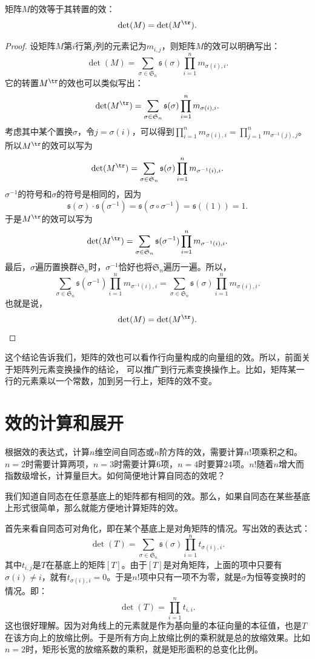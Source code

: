 \documentclass[12pt,UTF8,fontset=none]{ctexbook}
\begin{document}
\begin{pp}\label{pp:10_35}
    矩阵$M$的效等于其转置的效：
    $$ \det(M) = \det(M^{\tr}).$$
\end{pp}
\begin{proof} %
    设矩阵$M$第$i$行第$j$列的元素记为$m_{i,j}$，则矩阵$M$的效可以明确写出：
    $$ \det (M) = \sum_{\sigma\in\mathfrak{S}_n} \mathfrak{s}(\sigma) \prod_{i=1}^n m_{\sigma(i),i}. $$
    它的转置$M^{\tr}$的效也可以类似写出：
    $$ \det (M^{\tr}) = \sum_{\sigma\in\mathfrak{S}_n} \mathfrak{s}(\sigma) \prod_{i=1}^n m_{\sigma(i), i}. $$
    考虑其中某个置换$\sigma$，令$j = \sigma(i)$，可以得到$\prod_{i=1}^n m_{\sigma(i), i} = \prod_{j=1}^n m_{\sigma^{-1}(j), j}$。
    所以$M^{\tr}$的效可以写为
    $$ \det (M^{\tr}) = \sum_{\sigma\in\mathfrak{S}_n} \mathfrak{s}(\sigma) \prod_{i=1}^n m_{\sigma^{-1}(i), i}. $$
    $\sigma^{-1}$的符号和$\sigma$的符号是相同的，因为
    $$ \mathfrak{s}(\sigma) \cdot \mathfrak{s}(\sigma^{-1}) = \mathfrak{s}(\sigma \circ \sigma^{-1}) = \mathfrak{s}((1)) = 1. $$
    于是$M^{\tr}$的效可以写为
    $$ \det (M^{\tr}) = \sum_{\sigma\in\mathfrak{S}_n} \mathfrak{s}(\sigma^{-1}) \prod_{i=1}^n m_{\sigma^{-1}(i), i}. $$
    最后，$\sigma$遍历置换群$\mathfrak{S}_n$时，$\sigma^{-1}$恰好也将$\mathfrak{S}_n$遍历一遍。所以，
    $$ \sum_{\sigma\in\mathfrak{S}_n} \mathfrak{s}(\sigma^{-1}) \prod_{i=1}^n m_{\sigma^{-1}(i), i} = \sum_{\sigma\in\mathfrak{S}_n} \mathfrak{s}(\sigma) \prod_{i=1}^n m_{\sigma(i), i}. $$
    也就是说，
    $$ \det(M) = \det(M^{\tr}).$$
\end{proof}

这个结论告诉我们，矩阵的效也可以看作行向量构成的向量组的效。所以，前面关于矩阵列元素变换操作的结论，
可以推广到行元素变换操作上。比如，矩阵某一行的元素乘以一个常数，加到另一行上，矩阵的效不变。

\section{效的计算和展开}
根据效的表达式，计算$n$维空间自同态或$n$阶方阵的效，需要计算$n!$项乘积之和。$n=2$时需要计算两项，$n=3$时需要计算$6$项，$n=4$时要算$24$项。$n!$随着$n$增大而指数级增长，计算量巨大。如何简便地计算自同态的效呢？

我们知道自同态在任意基底上的矩阵都有相同的效。那么，如果自同态在某些基底上形式很简单，那么就能方便地计算矩阵的效。

首先来看自同态可对角化，即在某个基底上是对角矩阵的情况。写出效的表达式：
$$
\det(T) = \sum_{\sigma\in\mathfrak{S}_n} \mathfrak{s}(\sigma) \prod_{i=1}^n t_{\sigma(i),i}.
$$
其中$t_{i,j}$是$T$在基底上的矩阵$[T]$。由于$[T]$是对角矩阵，上面的项中只要有$\sigma(i)\neq i$，就有$t_{\sigma(i),i} = 0$。于是$n!$项中只有一项不为零，就是$\sigma$为恒等变换时的情况。即：
$$
\det(T) = \prod_{i=1}^n t_{i,i}.
$$
这也很好理解。因为对角线上的元素就是作为基向量的本征向量的本征值，也是$T$在该方向上的放缩比例。于是所有方向上放缩比例的乘积就是总的放缩效果。比如$n=2$时，矩形长宽的放缩系数的乘积，就是矩形面积的总变化比例。
\end{document}
